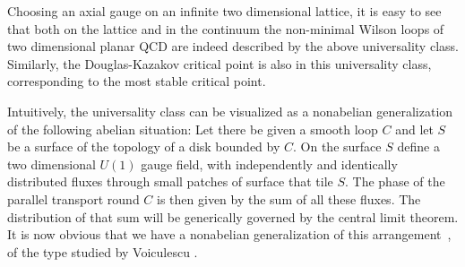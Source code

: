 Choosing an axial gauge on an infinite two dimensional lattice, it
is easy to see that both on the lattice and in the continuum
\cite{duol} the non-minimal Wilson loops of two dimensional planar
QCD are indeed described by the above universality class.
Similarly, the Douglas-Kazakov critical point is also in this
universality class, corresponding to the most stable critical
point.

Intuitively, the universality class can be visualized as a
nonabelian generalization of the following abelian situation:
Let there be given a smooth loop $C$ and let $S$ be a surface
of the topology of a disk bounded by $C$. On the surface $S$
define a two dimensional  $U(1)$ gauge field, with independently
and identically distributed fluxes through small patches of
surface that tile  $S$. The phase of the parallel transport
round $C$ is then given by the sum of all these fluxes. The
distribution of that sum will be generically governed by the
central limit theorem. It is now obvious that we have a nonabelian
generalization of this arrangement~\cite{janik}, of the type studied by
Voiculescu \cite{voicu}.
